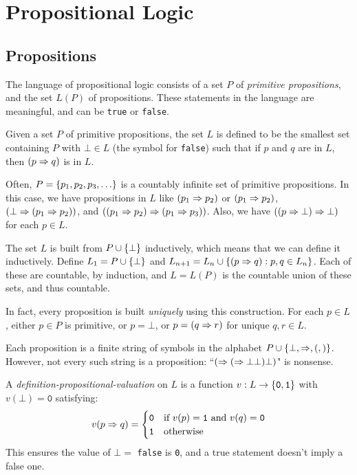 \documentclass{article}
\begin{document}
\makecover

\section{Propositional Logic}
\subsection{Propositions}
\label{section-propositional-logic}

The language of propositional logic consists of a set $P$ of \textit{primitive propositions}, and the set $L(P)$ of propositions. These statements in the language are meaningful, and can be \texttt{true} or \texttt{false}.

\begin{definition}
	\label{definition-set-of-propositions}
    Given a set $P$ of primitive propositions, the set $L$ is defined to be the smallest set containing $P$ with $\bot \in L$ (the symbol for \texttt{false}) such that if $p$ and $q$ are in $L$, then $(p \Rightarrow q)$ is in $L$.
\end{definition}

Often, $P = \set{p_1, p_2, p_3, \dots}$ is a countably infinite set of primitive propositions. In this case, we have propositions in $L$ like $(p_1 \Rightarrow p_2)$ or  $(p_1 \Rightarrow p_2)$,  $(\bot \Rightarrow (p_1 \Rightarrow p_2))$, and $((p_1 \Rightarrow p_2) \Rightarrow (p_1 \Rightarrow p_3))$. Also, we have $((p \Rightarrow \bot) \Rightarrow \bot)$ for each $p \in L$.

The set $L$ is built from $P \cup \left\lbrace \bot \right\rbrace$ inductively, which means that we can define it inductively. Define $L_1 = P \cup \left\lbrace \bot \right\rbrace$ and $L_{n+1} = L_n \cup \left\lbrace (p \Rightarrow q) : p, q \in L_n \right\rbrace$. Each of these are countable, by induction, and $L = L(P)$ is the countable union of these sets, and thus countable.

In fact, every proposition is built \textit{uniquely} using this construction. For each $p \in L$, either $p \in P$ is primitive, or $p = \bot$, or $p = (q \Rightarrow r)$ for unique $q, r \in L$.

\begin{note}
	Each proposition is a finite string of symbols in the alphabet $P \cup \left\lbrace \bot, \Rightarrow, (, ) \right\rbrace$. However, not every such string is a proposition: ``$( \Rightarrow ( \Rightarrow \bot \bot ) \bot )$" is nonsense.
\end{note}

\begin{definition}[Valuation]
	\label{definition-propositional-valuation}
    A \textit{definition-propositional-valuation} on $L$ is a function $v: L \to \left\lbrace \texttt{0}, \texttt{1} \right\rbrace$ with $v(\bot) = \texttt{0}$ satisfying:
	\[
	v(p \Rightarrow q) = \begin{cases}
		\texttt{0} & \text{if } v(p) = \texttt{1} \text{ and } v(q) = \texttt{0} \\
		\texttt{1} & \!\mathrel{\, \text{otherwise}}
	\end{cases}
	\]
	This ensures the value of $\bot = $ \texttt{false} is \texttt{0}, and a true statement doesn't imply a false one.
\end{definition}
\end{document}
